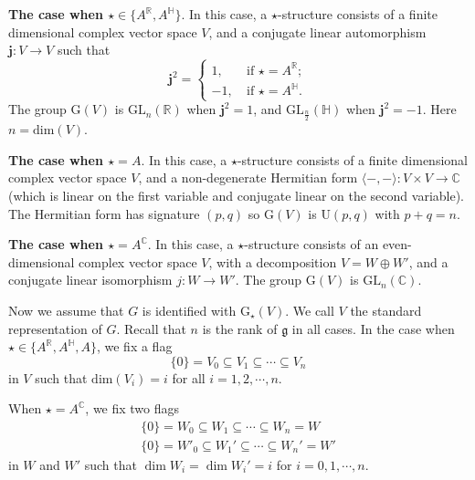 \documentclass[12pt, a4paper]{amsart}
\numberwithin{equation}{section}
\newcommand{\BC}{{\mathbb {C}}}
\newcommand{\BH}{{\mathbb {H}}}
\newcommand{\BR}{{\mathbb {R}}}
\newcommand{\fg}{\mathfrak{g}}
\newcommand{\GL}{{\mathrm{GL}}}
\newcommand{\G}{{\mathrm{G}}}
\newcommand{\U}{{\mathrm{U}}}
\begin{document}
   \textbf{The case when $\star \in \{A^{\BR},A^{\BH}\}$}. In this case, a $\star$-structure consists of a finite dimensional complex vector space $V$, and a conjugate linear automorphism $\mathbf{j}: V \to V$ such that
   $$\mathbf{j}^2 = \left\{
   \begin{aligned}
    1 , & \  \textrm{if $\star = A^{\BR}$}; \\
      -1, & \  \textrm{if $\star = A^{\BH}$}.
   \end{aligned}
   \right.$$
   The group $\G(V)$ is $\GL_n(\BR)$ when $\mathbf{j}^2 = 1$, and $\GL_{\frac{n}{2}}(\BH)$ when $\mathbf{j}^2 = -1$. Here $n = \mathrm{dim}(V)$.

   \textbf{The case when $\star = A$}. In this case, a $\star$-structure consists of a finite dimensional complex vector space $V$, and a non-degenerate Hermitian form $\langle -,- \rangle: V \times V \to \BC$ (which is linear on the first variable and conjugate linear on the second variable). The Hermitian form has signature $(p,q)$ so $\G(V)$ is $\U(p,q)$ with $p+q=n$.

    \textbf{The case when $\star = A^\BC$}. In this case, a $\star$-structure consists of an even-dimensional complex vector space
    $V$, with a decomposition $V = W \oplus W'$, and a conjugate linear isomorphism $j: W \to W'$. The group $\G(V)$ is $\GL_n(\BC)$.

   Now we assume that $G$ is identified with $\G_{\star}(V)$. We call $V$ the standard representation of $G$. Recall that $n$ is the rank of $\fg$ in all cases. 
   In the case when $\star \in \{A^\BR,A^\BH,A\}$, we fix a flag
\begin{equation}\label{flag}
   \{0\} = V_0 \subseteq V_1 \subseteq \cdots \subseteq V_n
\end{equation}
in $V$ such that $\mathrm{dim}(V_i) = i$ for all $i = 1,2,\cdots,n$.

When $\star = A^\BC$, we fix two flags
\begin{align}
    \{0\} = W_0 \subseteq W_1 \subseteq \cdots \subseteq W_n = W \\
    \{0\} = W'_0 \subseteq W_1' \subseteq \cdots \subseteq W_n' = W'
\end{align}
in $W$ and $W'$ such that $\dim W_i = \dim W_i' = i$ for $i = 0, 1, \cdots ,n$.
\end{document}
